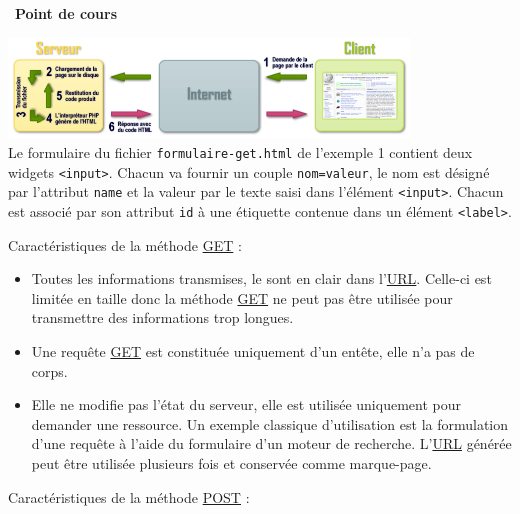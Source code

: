 \documentclass[
  11pt,
]{article}
\newcommand{\passthrough}[1]{#1}
\providecommand{\tightlist}{%
  \setlength{\itemsep}{0pt}\setlength{\parskip}{0pt}}
\newcounter{rque}
\newcounter{cours}
\newenvironment{cours}[1]
{\par \medskip   \addtocounter{cours}{1} \noindent  
\begin{bclogo}[arrondi =0.1,  ombre = true, barre=none, logo=\bcbook, marge=4]{~\textbf{Point de cours} \textbf{\thecours} {\itshape #1} }  \par}
{
\end{bclogo}
 \par \bigskip }
\begin{document}
\begin{cours}{}
\includegraphics[width=0.8\textwidth,height=\textheight]{images/Php_arch_shema.png}\\

Le formulaire du fichier \passthrough{\lstinline!formulaire-get.html!}
de l'exemple 1 contient deux widgets \passthrough{\lstinline!<input>!}.
Chacun va fournir un couple \passthrough{\lstinline!nom=valeur!}, le nom
est désigné par l'attribut \passthrough{\lstinline!name!} et la valeur
par le texte saisi dans l'élément \passthrough{\lstinline!<input>!}.
Chacun est associé par son attribut \passthrough{\lstinline!id!} à une
étiquette contenue dans un élément \passthrough{\lstinline!<label>!}.

Caractéristiques de la méthode
\href{https://developer.mozilla.org/fr/docs/Web/HTTP/M\%C3\%A9thode/GET}{GET}
:

\begin{itemize}
\tightlist
\item
  Toutes les informations transmises, le sont en clair dans
  l'\href{https://developer.mozilla.org/fr/docs/Glossaire/URL}{URL}.
  Celle-ci est limitée en taille donc la méthode
  \href{https://developer.mozilla.org/fr/docs/Web/HTTP/M\%C3\%A9thode/GET}{GET}
  ne peut pas être utilisée pour transmettre des informations trop
  longues.
\item
  Une requête
  \href{https://developer.mozilla.org/fr/docs/Web/HTTP/M\%C3\%A9thode/GET}{GET}
  est constituée uniquement d'un entête, elle n'a pas de corps.
\item
  Elle ne modifie pas l'état du serveur, elle est utilisée uniquement
  pour demander une ressource. Un exemple classique d'utilisation est la
  formulation d'une requête à l'aide du formulaire d'un moteur de
  recherche.
  L'\href{https://developer.mozilla.org/fr/docs/Glossaire/URL}{URL}
  générée peut être utilisée plusieurs fois et conservée comme
  marque-page.
\end{itemize}

Caractéristiques de la méthode
\href{https://developer.mozilla.org/fr/docs/Web/HTTP/M\%C3\%A9thode/POST}{POST}
:


\end{cours}
\end{document}
